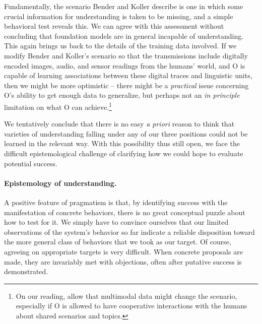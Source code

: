 Fundamentally, the scenario Bender and Koller describe is one in which some crucial information for understanding is taken to be missing, and a simple behavioral test reveals this. We can agree with this assessment without concluding that foundation models are in general incapable of understanding. This again brings us back to the details of the training data involved. If we modify Bender and Koller’s scenario so that the transmissions include digitally encoded images, audio, and sensor readings from the humans’ world, and O is capable of learning associations between these digital traces and linguistic units, then we might be more optimistic – there might be a \textit{practical} issue concerning O’s ability to get enough data to generalize, but perhaps not an \textit{in principle} limitation on what O can achieve.\footnote{On our reading, \citet{bender2020climbing} allow that multimodal data might change the scenario, especially if O is allowed to have cooperative interactions with the humans about shared scenarios and topics.}

We tentatively conclude that there is no easy \textit{a priori} reason to think that varieties of understanding falling under any of our three positions could not be learned in the relevant way. With this possibility thus still open, we face the difficult epistemological challenge of clarifying how we could hope to evaluate potential success.

\paragraph{Epistemology of understanding.} 

A positive feature of pragmatism is that, by identifying success with the manifestation of concrete behaviors, there is no great conceptual puzzle about how to test for it. We simply have to convince ourselves that our limited observations of the system’s behavior so far indicate a reliable disposition toward the more general class of behaviors that we took as our target. Of course, agreeing on appropriate targets is very difficult. When concrete proposals are made, they are invariably met with objections, often after putative success is demonstrated.

